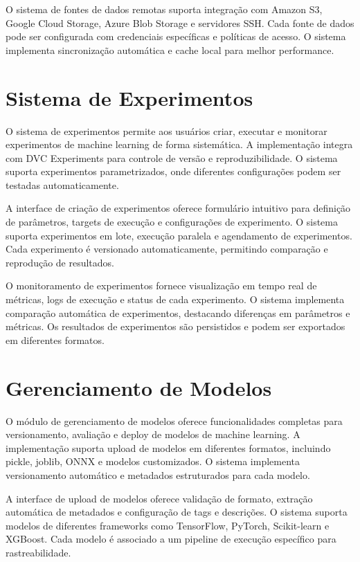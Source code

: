 \documentclass[12pt,a4paper]{article}
\begin{document}
O sistema de fontes de dados remotas suporta integração com Amazon S3, Google Cloud Storage, Azure Blob Storage e servidores SSH. Cada fonte de dados pode ser configurada com credenciais específicas e políticas de acesso. O sistema implementa sincronização automática e cache local para melhor performance.

\section{Sistema de Experimentos}

O sistema de experimentos permite aos usuários criar, executar e monitorar experimentos de machine learning de forma sistemática. A implementação integra com DVC Experiments para controle de versão e reproduzibilidade. O sistema suporta experimentos parametrizados, onde diferentes configurações podem ser testadas automaticamente.

A interface de criação de experimentos oferece formulário intuitivo para definição de parâmetros, targets de execução e configurações de experimento. O sistema suporta experimentos em lote, execução paralela e agendamento de experimentos. Cada experimento é versionado automaticamente, permitindo comparação e reprodução de resultados.

O monitoramento de experimentos fornece visualização em tempo real de métricas, logs de execução e status de cada experimento. O sistema implementa comparação automática de experimentos, destacando diferenças em parâmetros e métricas. Os resultados de experimentos são persistidos e podem ser exportados em diferentes formatos.

\section{Gerenciamento de Modelos}

O módulo de gerenciamento de modelos oferece funcionalidades completas para versionamento, avaliação e deploy de modelos de machine learning. A implementação suporta upload de modelos em diferentes formatos, incluindo pickle, joblib, ONNX e modelos customizados. O sistema implementa versionamento automático e metadados estruturados para cada modelo.

A interface de upload de modelos oferece validação de formato, extração automática de metadados e configuração de tags e descrições. O sistema suporta modelos de diferentes frameworks como TensorFlow, PyTorch, Scikit-learn e XGBoost. Cada modelo é associado a um pipeline de execução específico para rastreabilidade.
\end{document}
